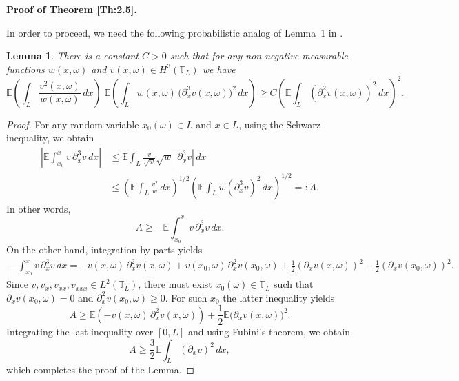 \documentclass[a4paper,12pt]{article}
\newtheorem{lemma}[definition]{Lemma}
\numberwithin{equation}{section}
\def\d{\partial}
\def\T{\mathbb{T}_L}
\def\E{\mathbb{E}}
\begin{document}
\bigskip

\noindent
\textbf{Proof of Theorem \ref{Th:2.5}.}

In order to proceed, we need the following probabilistic analog of Lemma~1 in \cite{Tud}.

\begin{lemma}
There is a constant $C>0$ such that for any non-negative measurable functions $w(x,\omega)$ and $v(x,\omega) \in H^3(\T)$ we have
\begin{equation}\label{6.13}
\mathbb{E}
\left(
\int_L \frac{v^2(x,\omega)}{w(x,\omega)}\,dx
\right)
\;
\mathbb{E}
\left(
\int_L w(x,\omega)\,
\big(\partial_x^3 v(x,\omega)\big)^2\,dx
\right)
\ge
C
\left(
\mathbb{E}
\int_L (\partial_x^2 v(x,\omega))^2\,dx
\right)^2.
\end{equation}

\end{lemma}

\begin{proof}
For any random variable $x_0(\omega) \in L$ and $x \in L$, 
using the Schwarz inequality, we obtain
\begin{align*}
\left|
\mathbb{E}
\int_{x_0}^x v\,\partial_x^3 v\,dx
\right|
& \leq \mathbb{E}
\int_L 
\frac{v}{\sqrt{w}}
\sqrt{w}\,|\partial_x^3 v|\,dx \\
&\le
\left(
\mathbb{E}
\int_L \frac{v^2}{w}\,dx
\right)^{1/2}
\left(
\mathbb{E}
\int_L w(\partial_x^3 v)^2\,dx
\right)^{1/2}
=: A.
\end{align*}
In other words,
\begin{equation*}\label{6.14}
A \geq  - \E \int_{x_0}^x v\,\partial_x^3 v\,dx.
\end{equation*}
On the other hand, integration by parts yields
\begin{multline*}
-\int_{x_0}^x v\,\partial_x^3 v\,dx
= - v(x,\omega)\,\partial_x^2 v(x, \omega) + v(x_0,\omega)\,\partial_x^2 v(x_0, \omega) + \frac{1}{2} (\d_x v(x, \omega))^2 - \frac{1}{2} (\d_x v(x_0, \omega))^2.
\end{multline*}
Since $v, v_x, v_{xx}, v_{xxx}\in L^2(\T)$, there must exist $x_0(\omega) \in \T$ such that $\d_x v(x_0, \omega) = 0$ and $\d_x^2 v(x_0,\omega) \geq 0$. For such $x_0$ the latter inequality yields
\[
A \ge
\mathbb{E}\!\left(
- v(x,\omega)\,\partial_x^2 v(x,\omega) \right)
+ \frac12 \mathbb{E}\bigl(\partial_x v(x,\omega)\bigr)^2
.
\]
Integrating the last inequality over $[0,L]$ and using Fubini's theorem, we obtain
\[
A \ge \frac32 \mathbb{E}\int_L (\partial_x v)^2\,dx,
\]
which completes the proof of the Lemma.
\end{proof}
\end{document}
